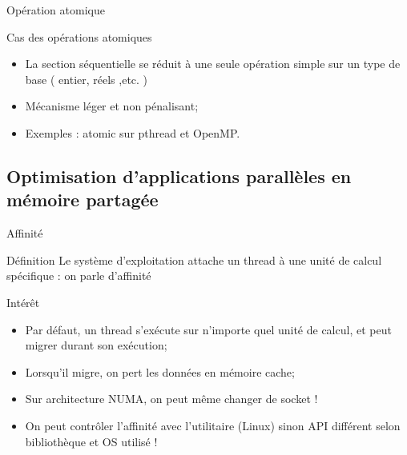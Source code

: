 \documentclass[handout,francais]{beamer}
\begin{document}
\begin{frame}[fragile]{Opération atomique}
 \begin{block}{Cas des opérations atomiques}
  \begin{itemize}
   \item La section séquentielle se réduit à une seule opération simple sur un type de base ( entier, réels ,etc. )
   \item Mécanisme léger et non pénalisant;
   \item Exemples : atomic sur pthread et OpenMP.
  \end{itemize}

 \end{block}

\end{frame}

\subsection{Optimisation d'applications parallèles en mémoire partagée}

\begin{frame}[fragile]{Affinité}
 
 \begin{block}{Définition}
  Le système d'exploitation attache un thread à une unité de calcul spécifique : on parle d'affinité
 \end{block}

 \begin{block}{Intérêt}
  \begin{itemize}
   \item Par défaut, un thread s'exécute sur n'importe quel unité de calcul, et peut migrer durant son exécution;
   \item Lorsqu'il migre, on pert les données en mémoire cache;
   \item Sur architecture NUMA, on peut même changer de socket !
   \item On peut contrôler l'affinité avec l'utilitaire \verb@taskset@ (Linux) sinon API différent selon bibliothèque et
   OS utilisé !
  \end{itemize}

 \end{block}
 
\end{frame}
\end{document}
